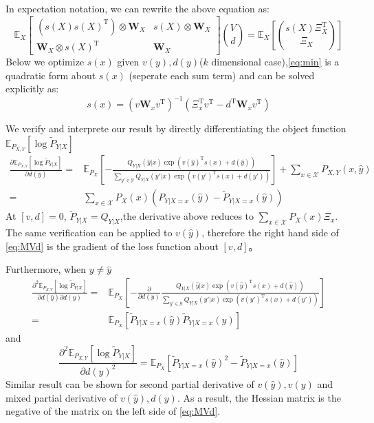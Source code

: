 \documentclass{article}
\def\T{\mathrm{T}}
\def\E{\mathbb{E}}
\begin{document}
In expectation notation, we can rewrite the above equation as:
\begin{equation}
\E_X\begin{bmatrix}
(s(X)s(X)^\T)\otimes \bm{W}_X & s(X)\otimes \bm{W}_X \\
\bm{W}_X\otimes s(X)^\T & \bm{W}_X
\end{bmatrix}\binom{V}{d}=\E_X\left[\binom{s(X)\Xi_X^\T}{\Xi_X}\right]
\end{equation}
Below we optimize $s(x)$ given $v(y),d(y)$($k$ dimensional case),\eqref{eq:min} is a quadratic form about $s(x)$ (seperate each sum term) and can be solved
explicitly as:
\begin{equation}
s(x)=(v\bm{W}_xv^\T)^{-1}(\Xi_x^\T v^\T -d^\T \bm{W}_x v^\T)
\end{equation}

We verify and interprete our result by directly differentiating the object function $\E_{P_{X,Y}}[\log \tilde{P}_{Y|X}]$
\begin{align*}
\frac{\partial \E_{P_{X,Y}}[\log \tilde{P}_{Y|X}]}{\partial d(\hat{y})} = & \E_{P_X}[-\frac{Q_{Y|X}(\hat{y}|x)\exp(v(\hat{y})^\T s(x)+d(\hat{y}))}{
\sum_{y'\in \mathcal{Y}}Q_{Y|X}(y'|x)\exp(v(y')^\T s(x)+d(y'))}]+\sum_{x\in \mathcal{X}} P_{X,Y}(x,\hat{y})\\
= & \sum_{x\in \mathcal{X}} P_X(x)(P_{Y|X=x}(\hat{y})-\tilde{P}_{Y|X=x}(\hat{y}))
\end{align*}
At $[v,d]=0$, $\tilde{P}_{Y|X}=Q_{Y|X}$,the derivative above reduces to $\sum_{x\in \mathcal{X}}P_X(x)\Xi_x$. The same verification can be applied to $v(\hat{y})$, therefore the right hand side of \eqref{eq:MVd} is the gradient of the loss function about $[v,d]$。

Furthermore, when $y\neq \hat{y}$
\begin{align*}
\frac{\partial^2 \E_{P_{X,Y}}[\log \tilde{P}_{Y|X}]}{\partial d(\hat{y})\partial d(y)} = & \E_{P_X}[-\frac{\partial}{\partial d(y)}\frac{Q_{Y|X}(\hat{y}|x)\exp(v(\hat{y})^\T s(x)+d(\hat{y}))}{
\sum_{y'\in \mathcal{Y}}Q_{Y|X}(y'|x)\exp(v(y')^\T s(x)+d(y'))}]\\
= & \E_{P_X}[\tilde{P}_{Y|X=x}(\hat{y})\tilde{P}_{Y|X=x}(y)]
\end{align*}
and
$$
\frac{\partial^2 \E_{P_{X,Y}}[\log \tilde{P}_{Y|X}]}{\partial d(\hat{y})^2} =
\E_{P_X}[\tilde{P}_{Y|X=x}(\hat{y})^2-\tilde{P}_{Y|X=x}(\hat{y})]
$$
Similar result can be shown for second partial derivative of $v(\hat{y}),v(y)$ and mixed partial derivative of $v(\hat{y}),d(y)$.
As a result, the Hessian matrix is the negative of the matrix on the left side of \eqref{eq:MVd}.
\end{document}

